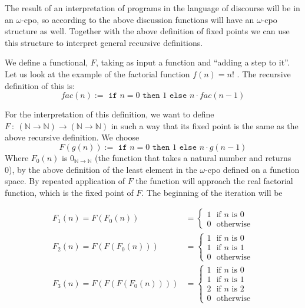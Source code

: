\documentclass[11pt, leqno, titlepage]{article}
\theoremstyle{definition}
\begin{document}
The result of an interpretation of programs in the language of discourse will be in
an $\omega$-cpo, so according to the above discussion functions will have an
$\omega$-cpo structure as well. Together with the above definition of fixed points we
can use this structure to interpret general recursive definitions. 

We define a functional, $F$, taking as input a function and ``adding a step to it''.
Let us look at the example of the factorial function $f(n) = n!$ \cite{haskell}.
The recursive definition of this is:
$$\textit{fac}(n) := \texttt{ if } n = 0 \texttt{ then }1\texttt{ else } n\cdot \textit{fac}(n-1)$$ 

For the interpretation of this definition, we want to define $F~:~(\mathbb{N} \to
\mathbb{N}) \to (\mathbb{N} \to \mathbb{N})$ in such a way that its fixed point is
the same as the above recursive definition. We choose
$$F(g(n)):=\texttt{ if }n=0\texttt{ then }1\texttt{ else }n\cdot g(n-1)$$
Where $F_0(n)$ is $0_{\mathbb{N} \to \mathbb{N}}$ (the function that takes a natural
number and returns 0), by the above definition of the least element in the
$\omega$-cpo defined on a function space. By repeated application of $F$ the function
will approach the real factorial function, which is the fixed point of $F$. The
beginning of the iteration will be

\begin{align*}
  F_1(n) = F(F_0(n)) & = \begin{cases}
                           1~~~\text{if }n\text{ is 0}\\
                           0~~~\text{otherwise}
                         \end{cases}
  \\
  F_2(n) = F(F(F_0(n))) & = \begin{cases}
                             1~~~\text{if }n\text{ is 0}\\
                             1~~~\text{if }n\text{ is 1}\\
                             0~~~\text{otherwise}
                           \end{cases}
  \\
  F_3(n) = F(F(F(F_0(n)))) & = \begin{cases}
                                1~~~\text{if }n\text{ is 0}\\
                                1~~~\text{if }n\text{ is 1}\\
                                2~~~\text{if }n\text{ is 2}\\
                                0~~~\text{otherwise}
                              \end{cases}
\end{align*}
\end{document}
